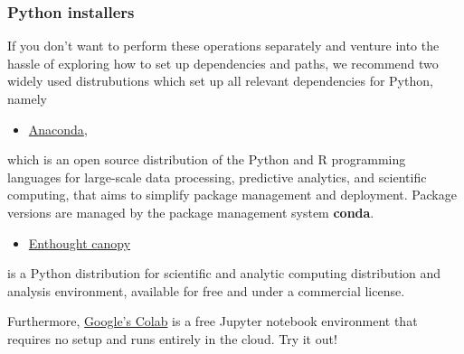 \documentclass{beamer}
\begin{document}
\begin{frame}
\frametitle{Python installers}

If you don't want to perform these operations separately and venture
into the hassle of exploring how to set up dependencies and paths, we
recommend two widely used distrubutions which set up all relevant
dependencies for Python, namely 

\begin{itemize}
\item \href{{https://docs.anaconda.com/}}{Anaconda}, 
\end{itemize}

\noindent
which is an open source
distribution of the Python and R programming languages for large-scale
data processing, predictive analytics, and scientific computing, that
aims to simplify package management and deployment. Package versions
are managed by the package management system \textbf{conda}. 

\begin{itemize}
\item \href{{https://www.enthought.com/product/canopy/}}{Enthought canopy} 
\end{itemize}

\noindent
is a Python
distribution for scientific and analytic computing distribution and
analysis environment, available for free and under a commercial
license.

Furthermore, \href{{https://colab.research.google.com/notebooks/welcome.ipynb}}{Google's Colab} is a free Jupyter notebook environment that requires 
no setup and runs entirely in the cloud. Try it out!
\end{frame}
\end{document}
